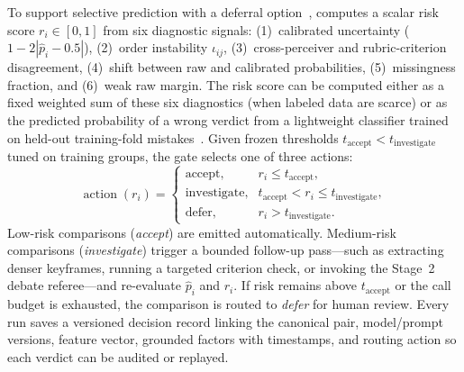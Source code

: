 To support selective prediction with a deferral option~\cite{geifman2017selective,madras2018predict}, \critical computes a scalar risk score $r_i\in[0,1]$ from six diagnostic signals: (1)~calibrated uncertainty ($1-2|\hat p_i-0.5|$), (2)~order instability $\iota_{ij}$, (3)~cross-perceiver and rubric-criterion disagreement, (4)~shift between raw and calibrated probabilities, (5)~missingness fraction, and (6)~weak raw margin. The risk score can be computed either as a fixed weighted sum of these six diagnostics (when labeled data are scarce) or as the predicted probability of a wrong verdict from a lightweight classifier trained on held-out training-fold mistakes~\cite{kamath2020selective}. Given frozen thresholds $t_{\mathrm{accept}}<t_{\mathrm{investigate}}$ tuned on training groups, the gate selects one of three actions:
\begin{equation}
\operatorname{action}(r_i)=
\begin{cases}
\text{accept}, & r_i\le t_{\mathrm{accept}},\\
\text{investigate}, & t_{\mathrm{accept}}<r_i\le t_{\mathrm{investigate}},\\
\text{defer}, & r_i>t_{\mathrm{investigate}}.
\end{cases}
\label{eq:route}
\end{equation}
Low-risk comparisons (\textit{accept}) are emitted automatically. Medium-risk comparisons (\textit{investigate}) trigger a bounded follow-up pass---such as extracting denser keyframes, running a targeted criterion check, or invoking the Stage~2 debate referee---and re-evaluate $\hat p_i$ and $r_i$. If risk remains above $t_{\mathrm{accept}}$ or the call budget is exhausted, the comparison is routed to \textit{defer} for human review. Every run saves a versioned decision record linking the canonical pair, model/prompt versions, feature vector, grounded factors with timestamps, and routing action so each verdict can be audited or replayed.
